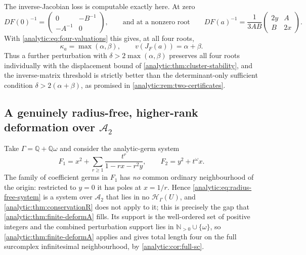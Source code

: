 \documentclass[11pt,letterpaper]{article}
\theoremstyle{definition}
\theoremstyle{remark}
\newcommand{\Q}{\mathbb Q}
\newcommand{\N}{\mathbb N}
\newcommand{\A}{\mathscr A}
\newcommand{\HH}{\mathcal H}
\numberwithin{equation}{section}
\begin{document}
The inverse-Jacobian loss is computable exactly here. At zero
\[
 DF(0)^{-1}=\begin{pmatrix}0&-B^{-1}\\-A^{-1}&0\end{pmatrix},
 \qquad\text{and at a nonzero root}\qquad
 DF(a)^{-1}=\frac1{3AB}\begin{pmatrix}2y&A\\B&2x\end{pmatrix}.
\]
With \eqref{analytic:eq:four-valuations} this gives, at all four roots,
\begin{equation}\label{analytic:eq:example-kappa}
 \kappa_a=\max(\alpha,\beta),\qquad v(J_F(a))=\alpha+\beta .
\end{equation}
Thus a further perturbation with $\delta>2\max(\alpha,\beta)$ preserves all
four roots individually with the displacement bound of
\cref{analytic:thm:cluster-stability}, and the inverse-matrix threshold is
strictly better than the determinant-only sufficient condition
$\delta>2(\alpha+\beta)$, as promised in
\cref{analytic:rem:two-certificates}.

\subsection{A genuinely radius-free, higher-rank deformation over $\A_2$}
\label{analytic:subsec:radius-free-example}
Take $\Gamma=\Q+\Q\omega$ and consider the analytic-germ system
\begin{equation}\label{analytic:eq:radius-free-system}
 F_1=x^2+\sum_{r\ge1}\frac{t^r}{1-rx-r^2y},\qquad
 F_2=y^2+t^\omega x .
\end{equation}
The family of coefficient germs in $F_1$ has \emph{no} common ordinary
neighbourhood of the origin: restricted to $y=0$ it has poles at $x=1/r$.
Hence \eqref{analytic:eq:radius-free-system} is a system over $\A_2$ that
lies in no $\HH_\Gamma(U)$, and
\cref{analytic:thm:conservationR} does not apply to it; this is precisely
the gap that \cref{analytic:thm:finite-deformA} fills. Its support is the
well-ordered set of positive integers and the combined perturbation support
lies in $\N_{>0}\cup\{\omega\}$, so
\cref{analytic:thm:finite-deformA} applies and gives total length four on
the full surcomplex infinitesimal neighbourhood, by
\cref{analytic:cor:full-sc}.
\end{document}

